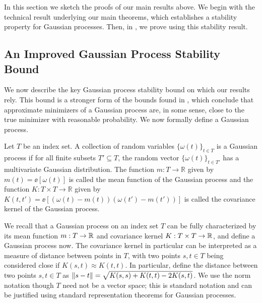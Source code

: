 In this section we sketch the proofs of our main results above.  We begin with the technical result underlying our main theorems, which establishes a stability property for Gaussian processes.  Then, in , we prove  using this stability result.  

\subsection{An Improved Gaussian Process Stability Bound}\label{ssec:gp-stability}
We now describe the key Gaussian process stability bound on which our results rely.  This bound is a stronger form of the bounds found in \citet{block2022smoothed,block2024oracle}, which conclude that approximate minimizers of a Gaussian process are, in some sense, close to the true minimizer with reasonable probability. We now formally define a Gaussian process. 
\begin{definition}
    Let $T$ be an index set. 
    A collection of random variables $ \{\omega(t) \}_{t \in T} $ is a Gaussian process if for all finite subsets $T' \subseteq T$, the random vector $\{ \omega(t)\}_{t \in T'}$ has a multivariate Gaussian distribution.
    The function $ m : T \to \mathbb{R} $ given by $ m(t) = \ee [\omega(t)] $ is called the mean function of the Gaussian process and 
    the function $ K : T \times T \to \mathbb{R} $ given by $ K(t, t') = \ee [(\omega(t) - m(t))(\omega(t') - m(t'))] $ is called the covariance kernel of the Gaussian process.
    
\end{definition}
We recall that a Gaussian process on an index set $T$ can be fully characterized by its mean function $m : T \to \mathbb{R}$ and covariance kernel $K: T \times T \to \mathbb{R}$, and define a Gaussian process now.  The covariance kernel in particular can be interpreted as a measure of distance between points in $T$, with two points $s,t \in T$ being considered close if $K(s, t) \approx K(t,t)$. 
In particular, define the distance between two points $s,t \in T$ as $\left\|s-t\right\| = \sqrt{K(s,s) + K(t,t) - 2K(s,t)}$.
We use the norm notation though $T$ need not be a vector space; this is standard notation and can be justified using standard representation theorems for Gaussian processes.  

